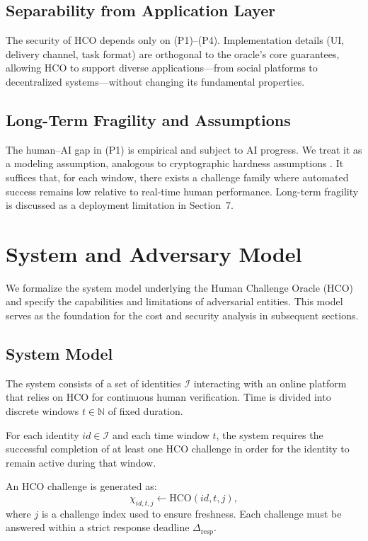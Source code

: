 \documentclass[sigconf,nonacm]{acmart}
\begin{document}
\subsection{Separability from Application Layer}

The security of HCO depends only on (P1)--(P4). Implementation details (UI, delivery channel, task format) are orthogonal to the oracle’s core guarantees, allowing HCO to support diverse applications---from social platforms to decentralized systems---without changing its fundamental properties.

\subsection{Long-Term Fragility and Assumptions}

The human--AI gap in (P1) is empirical and subject to AI progress. We treat it as a modeling assumption, analogous to cryptographic hardness assumptions \cite{bellare1993random}. It suffices that, for each window, there exists a challenge family where automated success remains low relative to real-time human performance. Long-term fragility is discussed as a deployment limitation in Section~7.
\section{System and Adversary Model}

We formalize the system model underlying the Human Challenge Oracle (HCO) and specify the capabilities and limitations of adversarial entities. This model serves as the foundation for the cost and security analysis in subsequent sections.

\subsection{System Model}

The system consists of a set of identities $\mathcal{I}$ interacting with an online platform that relies on HCO for continuous human verification. Time is divided into discrete windows $t \in \mathbb{N}$ of fixed duration.

For each identity $id \in \mathcal{I}$ and each time window $t$, the system requires the successful completion of at least one HCO challenge in order for the identity to remain active during that window.

An HCO challenge is generated as:
\[
\chi_{id,t,j} \leftarrow \mathrm{HCO}(id, t, j),
\]
where $j$ is a challenge index used to ensure freshness. Each challenge must be answered within a strict response deadline $\Delta_{\mathrm{resp}}$.
\end{document}
